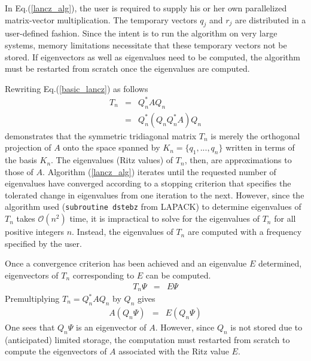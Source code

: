 \documentclass[twoside,12pt]{article}
\newlength{\temporary}
\begin{document}
In Eq.(\ref{lancz_alg}), the user is required to supply his or her own
parallelized matrix-vector multiplication.  The temporary vectors $q_j$ 
and $r_j$ are distributed in a user-defined fashion.
Since the intent is to run the algorithm on very large systems, memory
limitations necessitate that these temporary vectors not be stored.
If eigenvectors as well as eigenvalues need to be computed,
the algorithm must be restarted from scratch once the eigenvalues are computed.

Rewriting Eq.(\ref{basic_lancz}) as follows 
\begin{eqnarray}\label{basic_lancz_meaning}
T_{n} 
&=& Q_{n}^{*}AQ_{n} \nonumber \\
&=& Q_n^* (Q_n Q_n^* A) Q_n
\end{eqnarray}
demonstrates that the symmetric tridiagonal matrix $T_n$ 
is merely the orthogonal projection of $A$ onto the space spanned 
by $K_n = \{ q_1, ..., q_n \}$ written in terms of the basis $K_n$.
The eigenvalues (Ritz values) of $T_n$, then, 
are approximations to those of $A$.
Algorithm (\ref{lancz_alg}) iterates until the requested number of
eigenvalues have converged according to a stopping criterion that
specifies the tolerated change in eigenvalues from one iteration to the next.
However, since the algorithm used ({\tt subroutine dstebz} from LAPACK) 
to determine eigenvalues of $T_n$ takes $\mathcal{O}(n^2)$ time, it 
is impractical to solve for the eigenvalues of $T_n$ for all 
positive integers $n$.  Instead, the eigenvalues of $T_n$ are
computed with a frequency specified by the user.

Once a convergence criterion has been achieved and an eigenvalue $E$
determined, eigenvectors of $T_n$ corresponding to $E$ can be computed.
\begin{eqnarray}
T_{n} \Psi &=& E \Psi
\end{eqnarray}
Premultiplying $T_n = Q_{n}^{*}AQ_{n}$ by $Q_n$ gives
\begin{eqnarray}
A (Q_n \Psi) &=& E (Q_n \Psi)
\end{eqnarray}
One sees that $Q_n \Psi$ is an eigenvector of $A$.  
However, since $Q_n$ is not stored due to (anticipated) limited
storage, the computation must restarted from scratch to compute
the eigenvectors of $A$ associated with the Ritz value $E$.
\end{document}
